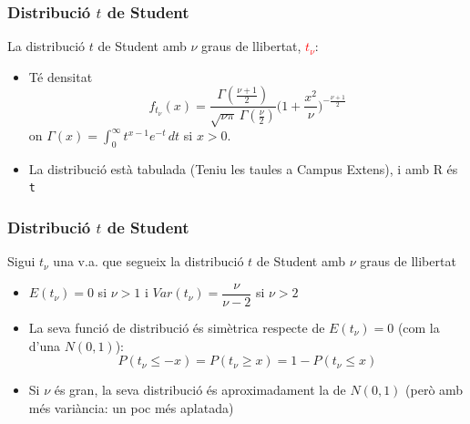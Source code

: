 \documentclass[12pt,t]{beamer}
\newcommand{\red}[1]{\textcolor{red}{#1}}
\renewcommand{\emph}[1]{{\color{red}#1}}
\renewcommand{\leq}{\leqslant}
\renewcommand{\geq}{\geqslant}
\theoremstyle{plain}
\theoremstyle{definition}
\begin{document}
\begin{frame}
\frametitle{Distribució $t$ de Student}


La distribució $t$ de Student amb $\nu$ graus de llibertat, \red{$t_{\nu}$}:
\medskip

\begin{itemize}
\item  Té densitat
$$
f_{t_\nu}(x) = \frac{\Gamma(\frac{\nu+1}{2})} {\sqrt{\nu\pi}\,\Gamma(\frac{\nu}{2})} \Big(1+\frac{x^2}{\nu} \Big)^{-\frac{\nu+1}{2}}
$$
on $\Gamma(x)=\int_{0}^{\infty} t^{x-1}e^{-t}\, dt$ si $x> 0$. 
\bigskip

\item La distribució està tabulada (\emph{Teniu les taules a Campus Extens}), i amb R és \texttt{t}

\end{itemize}

\end{frame}




\begin{frame}
\frametitle{Distribució $t$ de Student}

Sigui $t_{\nu}$ una v.a. que segueix la distribució $t$ de
Student amb $\nu$ graus de llibertat
\medskip

\begin{itemize}
\item $E(t_{\nu})=0$  si $\nu>1$ i $Var(t_{\nu})=\dfrac{\nu}{\nu-2}$ si $\nu>2$
\medskip

\item La seva funció de distribució és simètrica respecte de $E(t_{\nu})=0$ (com la d'una $N(0,1)$):
$$
P(t_{\nu}\leq -x)=P(t_{\nu}\geq x)=1-P(t_{\nu}\leq x)
$$

\item Si $\nu$ és gran, la seva distribució és aproximadament la de $N(0,1)$ (però amb més variància: un poc més aplatada)
\end{itemize}

\end{frame}
\end{document}

